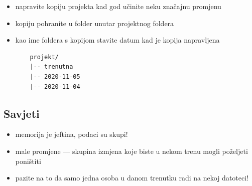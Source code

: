 \documentclass[aspectratio=169]{beamer}
\begin{document}
\begin{frame}[fragile]
    \begin{itemize}
        \setlength{\itemsep}{2em}

        \item napravite kopiju projekta kad god učinite neku značajnu promjenu

        \pause

        \item kopiju pohranite u folder unutar projektnog foldera

        \item kao ime foldera s kopijom stavite datum kad je kopija napravljena

        \pause

        \begin{lstlisting}
    projekt/
    |-- trenutna
    |-- 2020-11-05
    |-- 2020-11-04
        \end{lstlisting}

    \end{itemize}
\end{frame}

\subsection{Savjeti}

\begin{frame}
    \begin{itemize}
        \setlength{\itemsep}{2em}

        \item memorija je jeftina, podaci su skupi!

        \pause

        \item male promjene --- skupina izmjena koje biste u nekom trenu
            mogli poželjeti poništiti

        \pause

        \item pazite na to da samo jedna osoba u danom trenutku radi na nekoj
            datoteci!

    \end{itemize}
\end{frame}
\end{document}
